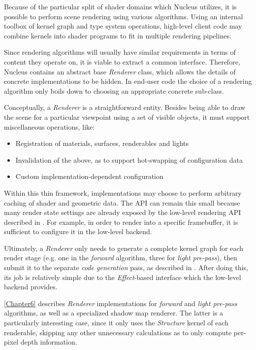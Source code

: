 Because of the particular split of shader domains which Nucleus utilizes, it is possible to perform scene rendering using various algorithms. Using an internal toolbox of kernel graph and type system operations, high-level client code may combine kernels into shader programs to fit in multiple rendering pipelines.

Since rendering algorithms will usually have similar requirements in terms of content they operate on, it is viable to extract a common interface. Therefore, Nucleus contains an abstract base \emph{Renderer} class, which allows the details of concrete implementations to be hidden. In end-user code the choice of a rendering algorithm only boils down to choosing an appropriate concrete sub-class.

Conceptually, a \emph{Renderer} is a straightforward entity. Besides being able to draw the scene for a particular viewpoint using a set of visible objects, it must support miscellaneous operations, like:

\begin{itemize}
\item Registration of materials, surfaces, renderables and lights
\item Invalidation of the above, as to support hot-swapping of configuration data
\item Custom implementation-dependent configuration
\end{itemize}

Within this thin framework, implementations may choose to perform arbitrary caching of shader and geometric data. The API can remain this small because many render state settings are already exposed by the low-level rendering API described in . For example, in order to render into a specific framebuffer, it is sufficient to configure it in the low-level backend.

Ultimately, a \emph{Renderer} only needs to generate a complete kernel graph for each render stage (e.g. one in the \emph{forward} algorithm, three for \emph{light pre-pass}), then submit it to the separate \emph{code generation} pass, as described in . After doing this, its job is relatively simple due to the \emph{Effect}-based interface which the low-level backend provides.

\cref{Chapter6} describes \emph{Renderer} implementations for \emph{forward} and \emph{light pre-pass} algorithms, as well as a specialized shadow map renderer. The latter is a particularly interesting case, since it only uses the \emph{Structure} kernel of each renderable, skipping any other unnecessary calculations as to only compute per-pixel depth information.

